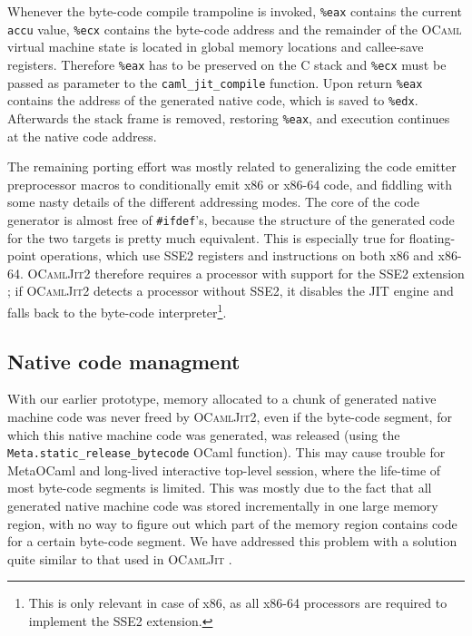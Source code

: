 \documentclass[12pt,a4paper,final]{article}
\begin{document}
Whenever the byte-code compile trampoline is invoked, \texttt{\%eax} contains
the current \texttt{accu} value, \texttt{\%ecx} contains the byte-code address
and the remainder of the \textsc{OCaml} virtual machine state is located in
global memory locations and callee-save registers. Therefore \texttt{\%eax}
has to be preserved on the C stack and \texttt{\%ecx} must be passed as parameter
to the \texttt{caml\_jit\_compile} function. Upon return \texttt{\%eax} contains
the address of the generated native code, which is saved to \texttt{\%edx}.
Afterwards the stack frame is removed, restoring \texttt{\%eax}, and execution
continues at the native code address.

The remaining porting effort was mostly related to generalizing the code
emitter preprocessor macros to conditionally emit x86 or x86-64 code, and fiddling with
some nasty details of the different addressing modes. The core of the code
generator is almost free of \texttt{\#ifdef}'s, because the structure of the generated code
for the two targets is pretty much equivalent. This is especially true for
floating-point operations, which use SSE2 registers and instructions on
both x86 and x86-64. \textsc{OCamlJit2} therefore requires a processor
with support for the SSE2 extension \cite{Amd09Vol1,Intel10Vol1}; if \textsc{OCamlJit2} detects a
processor without SSE2, it disables the JIT engine and falls back to
the byte-code interpreter\footnote{This is only relevant in case of x86,
as all x86-64 processors are required to implement the SSE2 extension.}.

\subsection{Native code managment} \label{subsection:Native_code_management}

With our earlier prototype, memory allocated to a chunk of generated native machine code was never freed
by \textsc{OCamlJit2}, even if the byte-code segment, for which this native machine code
was generated, was released (using the \texttt{Meta.static\_release\_bytecode} OCaml
function). This may cause trouble for MetaOCaml \cite{Taha06} and long-lived interactive
top-level session, where the life-time of most byte-code segments is limited.
This was mostly due to the fact that all generated native machine code was stored 
incrementally in one large memory region, with no way to figure out which part of
the memory region contains code for a certain byte-code segment. We have addressed
this problem with a solution quite similar to that used in \textsc{OCamlJit}
\cite{Starynkevitch04}.
\end{document}
